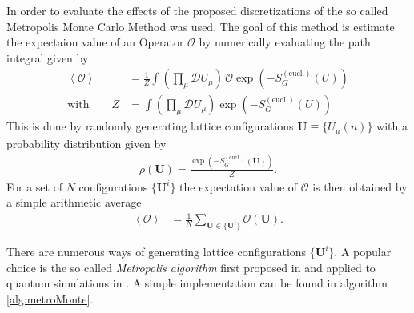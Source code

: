In order to evaluate the effects of the proposed discretizations of \SUTwo the so called Metropolis Monte Carlo Method was used. The goal of this method is estimate the expectaion value of an Operator $\mathcal{O}$ by numerically evaluating the path integral given by
\begin{align*}
 \left\langle \mathcal{O} \right\rangle & = \frac{1}{Z}\int \left( \prod_\mu \mathcal{D} U_\mu \right) \, \mathcal{O} \exp \left( - S_G^{(\textrm{eucl.})}(U)\right) \\
 \textrm{with} \qquad Z                 & = \int \left( \prod_\mu \mathcal{D} U_\mu \right) \exp \left( - S_G^{(\textrm{eucl.})}(U)\right)
\end{align*}
This is done by randomly generating lattice configurations $\boldsymbol{U} \equiv \{ U_\mu(n) \}$ with a probability distribution given by
\begin{align}
 \rho ( \boldsymbol{U} ) = \frac{\exp\left(  -S_G^{(\textrm{eucl.})}(\boldsymbol{U}) \right)}{Z} \textrm{.}
 \label{eq:metroDist}
\end{align}
For a set of $N$ configurations $\{ \boldsymbol{U}^i \}$ the expectation value of $\mathcal{O}$ is then obtained by a simple arithmetic average
\begin{align*}
 \left\langle \mathcal{O} \right\rangle & = \frac{1}{N} \sum_{\boldsymbol{U} \in \{ \boldsymbol{U}^i \}} \mathcal{O} (\boldsymbol{U}) \textrm{.}
\end{align*}

There are numerous ways of generating lattice configurations $\{ \boldsymbol{U}^i \}$. A popular choice is the so called \emph{Metropolis algorithm} first proposed in \cite{metropolis:1953} and applied to quantum simulations in \cite{Creutz:1981}. A simple implementation can be found in algorithm \ref{alg:metroMonte}.

